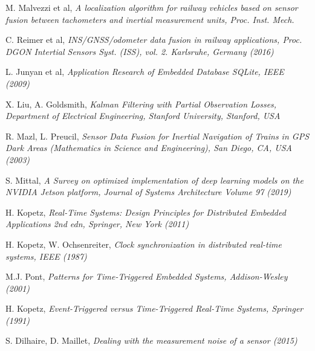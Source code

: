 \begin{thebibliography}{9}
M. Malvezzi et al, \textit{A localization algorithm for railway vehicles based on sensor fusion between tachometers and inertial measurement units, Proc. Inst. Mech.}

C. Reimer et al, \textit{INS/GNSS/odometer
data fusion in railway applications, Proc. DGON Intertial Sensors
Syst. (ISS), vol. 2. Karlsruhe, Germany (2016)} 

L. Junyan et al, \textit{Application Research of Embedded Database SQLite, IEEE (2009)}

X. Liu, A. Goldsmith, \textit{
Kalman  Filtering with Partial Observation Losses, Department of Electrical Engineering, Stanford University, Stanford, USA}

R. Mazl, L. Preucil, \textit{Sensor Data Fusion for Inertial Navigation of
Trains in GPS Dark Areas (Mathematics in Science and Engineering),
San Diego, CA, USA (2003)}

S. Mittal, \textit{A Survey on optimized implementation of deep learning models on the NVIDIA Jetson platform, Journal of Systems Architecture
Volume 97 (2019)}
	

H. Kopetz, \textit{Real-Time Systems: Design Principles for Distributed Embedded Applications 2nd edn, Springer, New York (2011)}

H. Kopetz, W. Ochsenreiter, \textit{Clock synchronization in distributed real-time systems, IEEE (1987)}

M.J. Pont, \emph{Patterns for Time-Triggered Embedded Systems, Addison-Wesley (2001)}

H. Kopetz, \emph{Event-Triggered versus Time-Triggered Real-Time Systems, Springer (1991)}

S. Dilhaire, D. Maillet, \textit{Dealing  with the measurement noise of a sensor (2015)}

\end{thebibliography}